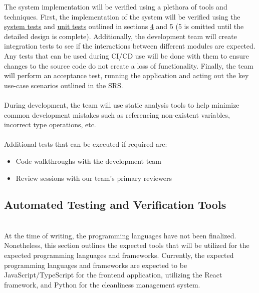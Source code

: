 \documentclass[12pt, titlepage]{article}
\begin{document}
The system implementation will be verified using a plethora of tools and techniques. First, the implementation of the system will be verified using the \hyperref[section:systemTests]{system tests} and \hyperref[section:unitTests]{unit tests} outlined in sections \hyperref[section:systemTests]{4} and 5 (5 is omitted until the detailed design is complete). Additionally, the development team will create integration tests to see if the interactions between different modules are expected. Any tests that can be used during CI/CD use will be done with them to ensure changes to the source code do not create a loss of functionality. Finally, the team will perform an acceptance test, running the application and acting out the key use-case scenarios outlined in the SRS.\\
\\
During development, the team will use static analysis tools to help minimize common development mistakes such as referencing non-existent variables, incorrect type operations, etc.\\
\\ Additional tests that can be executed if required are:
\begin{itemize}
\item Code walkthroughs with the development team
\item Review sessions with our team's primary reviewers
\end{itemize}

\subsection{Automated Testing and Verification Tools}
\label{subsec:tools}


\\ 
	At the time of writing, the programming languages have not been finalized. Nonetheless, this section outlines the expected tools that will be utilized for the expected programming languages and frameworks. Currently, the expected programming languages and frameworks are expected to be JavaScript/TypeScript for the frontend application, utilizing the React framework, and Python for the cleanliness management system.
  
\end{document}
